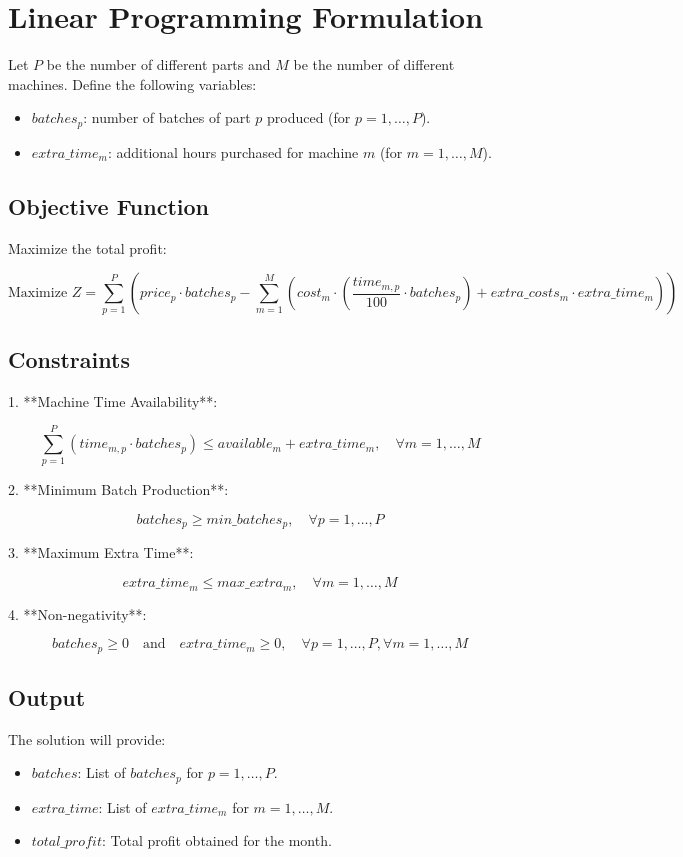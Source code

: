 \documentclass{article}
\begin{document}
\section*{Linear Programming Formulation}

Let \( P \) be the number of different parts and \( M \) be the number of different machines. Define the following variables:

\begin{itemize}
    \item \( batches_{p} \): number of batches of part \( p \) produced (for \( p = 1, \ldots, P \)).
    \item \( extra\_time_{m} \): additional hours purchased for machine \( m \) (for \( m = 1, \ldots, M \)).
\end{itemize}

\subsection*{Objective Function}
Maximize the total profit:

\[
\text{Maximize } Z = \sum_{p=1}^{P} \left( price_{p} \cdot batches_{p} - \sum_{m=1}^{M} (cost_{m} \cdot \left( \frac{time_{m,p}}{100} \cdot batches_{p} \right) + extra\_costs_{m} \cdot extra\_time_{m}) \right)
\]

\subsection*{Constraints}
1. **Machine Time Availability**:

\[
\sum_{p=1}^{P} \left( time_{m,p} \cdot batches_{p} \right) \leq available_{m} + extra\_time_{m}, \quad \forall m = 1, \ldots, M
\]

2. **Minimum Batch Production**:

\[
batches_{p} \geq min\_batches_{p}, \quad \forall p = 1, \ldots, P
\]

3. **Maximum Extra Time**:

\[
extra\_time_{m} \leq max\_extra_{m}, \quad \forall m = 1, \ldots, M
\]

4. **Non-negativity**:

\[
batches_{p} \geq 0 \quad \text{and} \quad extra\_time_{m} \geq 0, \quad \forall p = 1, \ldots, P, \forall m = 1, \ldots, M
\]

\subsection*{Output}
The solution will provide:
\begin{itemize}
    \item \( batches \): List of \( batches_{p} \) for \( p = 1, \ldots, P \).
    \item \( extra\_time \): List of \( extra\_time_{m} \) for \( m = 1, \ldots, M \).
    \item \( total\_profit \): Total profit obtained for the month.
\end{itemize}
\end{document}
